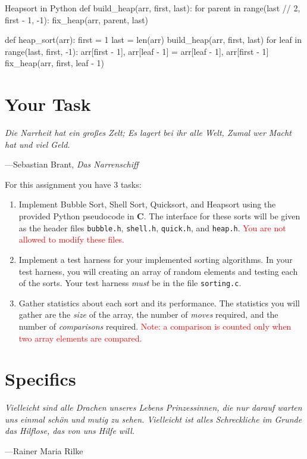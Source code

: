 \documentclass[11pt]{article}
\begin{document}
\begin{pythonlisting}{Heapsort in Python}
def build_heap(arr, first, last):
    for parent in range(last // 2, first - 1, -1):
        fix_heap(arr, parent, last)

def heap_sort(arr):
    first = 1
    last = len(arr)
    build_heap(arr, first, last)
    for leaf in range(last, first, -1):
        arr[first - 1], arr[leaf - 1] = arr[leaf - 1], arr[first - 1]
        fix_heap(arr, first, leaf - 1)
\end{pythonlisting}


\section{Your Task}

\epigraph{\emph{Die Narrheit hat ein gro\ss{}es Zelt; Es lagert bei ihr alle
Welt, Zumal wer Macht hat und viel Geld.}}{---Sebastian Brant, \emph{Das
Narrenschiff}}

For this assignment you have 3 tasks:
\begin{enumerate}
  \item Implement Bubble Sort, Shell Sort, Quicksort, and Heapsort using
    the provided Python pseudocode in \textbf{C}. The interface for
    these sorts will be given as the header files \texttt{bubble.h},
    \texttt{shell.h}, \texttt{quick.h}, and \texttt{heap.h}.
    \textcolor{red}{You are not allowed to modify these files.}
  \item Implement a test harness for your implemented sorting
    algorithms. In your test harness, you will creating an array of
    random elements and testing each of the sorts. Your test harness
    \emph{must} be in the file \texttt{sorting.c}.
  \item Gather statistics about each sort and its performance. The
    statistics you will gather are the \emph{size} of the array, the
    number of \emph{moves} required, and the number of
    \emph{comparisons} required. \textcolor{red}{Note: a comparison is
    counted only when two array elements are compared.}
\end{enumerate}


\section{Specifics}

\epigraph{\emph{Vielleicht sind alle Drachen unseres Lebens
  Prinzessinnen, die nur darauf warten uns einmal sch\"on und mutig zu
sehen. Vielleicht ist alles Schreckliche im Grunde das Hilflose, das von
uns Hilfe will.}}{---Rainer Maria Rilke}
\end{document}
